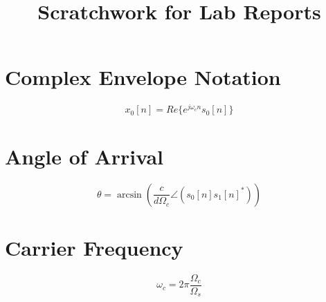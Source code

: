 \documentclass{article}
\title{Scratchwork for Lab Reports}
\date{}
\begin{document}
	
	\maketitle
	
	\section{Complex Envelope Notation}
	\[
	x_0[n] = Re\{e^{j \omega_c n} s_0[n]\}
	\]
	
	\section{Angle of Arrival}
	\[
	\theta = \arcsin(\frac{c} {d \Omega_c} \angle(s_0[n] s_1[n]^{\ast}))
	\]
	
	\section{Carrier Frequency}
	\[
	\omega_c = 2 \pi \frac{\Omega_c}{\Omega_s}
	\]
	
\end{document}
